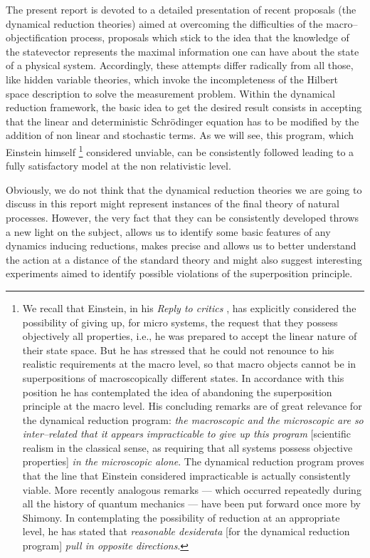 \documentclass[10pt,a4paper]{article}
\begin{document}
The present report is devoted to a detailed presentation of recent
proposals (the dynamical reduction theories) aimed at overcoming
the difficulties of the macro--objectification process, proposals
which stick to the idea that the knowledge of the statevector
represents the maximal information one can have about the state of
a physical system. Accordingly, these attempts differ radically
from all those, like hidden variable theories, which invoke the
incompleteness of the Hilbert space description to solve the
measurement problem. Within the dynamical reduction framework, the
basic idea to get the desired result consists in accepting that
the linear and deterministic Schr\"odinger equation has to be
modified by the addition of non linear and stochastic terms. As we
will see, this program, which Einstein himself \footnote{We recall that
Einstein, in his {\it Reply to critics} \cite{eini}, has explicitly
considered the possibility of giving up, for micro systems, the request
that they possess objectively all properties, i.e., he was prepared to
accept the linear nature of their state space. But he has stressed that he
could not renounce to his realistic requirements at the macro
level, so that macro objects cannot be in superpositions of
macroscopically different states. In accordance with this position
he has contemplated the idea of abandoning the superposition
principle at the macro level. His concluding remarks are of great
relevance for the dynamical reduction program: {\it the
macroscopic and the microscopic are so inter--related that it
appears impracticable to give up this program} [scientific realism
in the classical sense, as requiring that all systems possess
objective properties] {\it in the microscopic alone}. The
dynamical reduction program proves that the line that Einstein
considered impracticable is actually consistently viable. More
recently analogous remarks --- which occurred repeatedly during
all the history of quantum mechanics --- have been put forward
once more by Shimony. In contemplating the possibility of
reduction at an appropriate level, he has stated that \cite{shimi}
{\it reasonable desiderata} [for the dynamical reduction program]
{\it pull in opposite directions}.}  considered unviable, can be
consistently followed leading to a fully satisfactory model at the non
relativistic level.

Obviously, we do not think that the  dynamical reduction theories
we are going to discuss in this report might represent instances
of the final theory of natural processes. However, the very fact
that they can be consistently developed throws a new light on the
subject, allows us to identify some basic features of any dynamics
inducing reductions, makes precise and allows us to better
understand the action at a distance of the standard theory and
might also suggest  interesting experiments aimed to identify
possible violations of the superposition principle.
\end{document}
